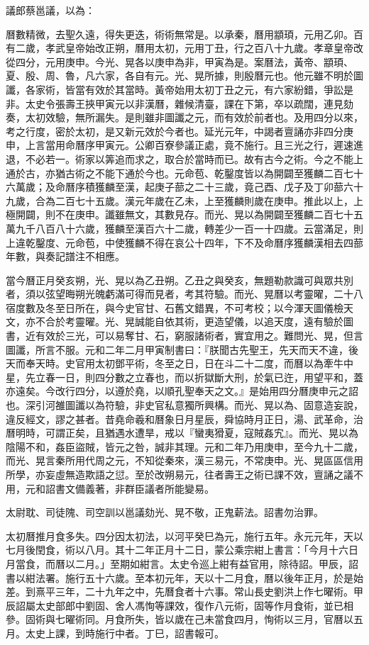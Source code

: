 \begin{pinyinscope}
議郎蔡邕議，以為：

曆數精微，去聖久遠，得失更迭，術術無常是。以承秦，曆用顓頊，元用乙卯。百有二歲，孝武皇帝始改正朔，曆用太初，元用丁丑，行之百八十九歲。孝章皇帝改從四分，元用庚申。今光、晃各以庚申為非，甲寅為是。案曆法，黃帝、顓頊、夏、殷、周、魯，凡六家，各自有元。光、晃所據，則殷曆元也。他元雖不明於圖讖，各家術，皆當有效於其當時。黃帝始用太初丁丑之元，有六家紛錯，爭訟是非。太史令張壽王挾甲寅元以非漢曆，雜候清臺，課在下第，卒以疏闊，連見劾奏，太初效驗，無所漏失。是則雖非圖讖之元，而有效於前者也。及用四分以來，考之行度，密於太初，是又新元效於今者也。延光元年，中謁者亶誦亦非四分庚申，上言當用命曆序甲寅元。公卿百寮參議正處，竟不施行。且三光之行，遲速進退，不必若一。術家以筭追而求之，取合於當時而已。故有古今之術。今之不能上通於古，亦猶古術之不能下通於今也。元命苞、乾鑿度皆以為開闢至獲麟二百七十六萬歲；及命曆序積獲麟至漢，起庚子蔀之二十三歲，竟己酉、戊子及丁卯蔀六十九歲，合為二百七十五歲。漢元年歲在乙未，上至獲麟則歲在庚申。推此以上，上極開闢，則不在庚申。讖雖無文，其數見存。而光、晃以為開闢至獲麟二百七十五萬九千八百八十六歲，獲麟至漢百六十二歲，轉差少一百一十四歲。云當滿足，則上違乾鑿度、元命苞，中使獲麟不得在哀公十四年，下不及命曆序獲麟漢相去四蔀年數，與奏記譜注不相應。

當今曆正月癸亥朔，光、晃以為乙丑朔。乙丑之與癸亥，無題勒款識可與眾共別者，須以弦望晦朔光魄虧滿可得而見者，考其符驗。而光、晃曆以考靈曜，二十八宿度數及冬至日所在，與今史官甘、石舊文錯異，不可考校；以今渾天圖儀檢天文，亦不合於考靈曜。光、晃誠能自依其術，更造望儀，以追天度，遠有驗於圖書，近有效於三光，可以易奪甘、石，窮服諸術者，實宜用之。難問光、晃，但言圖讖，所言不服。元和二年二月甲寅制書曰：『朕聞古先聖王，先天而天不違，後天而奉天時。史官用太初鄧平術，冬至之日，日在斗二十二度，而曆以為牽牛中星，先立春一日，則四分數之立春也，而以折獄斷大刑，於氣已迕，用望平和，蓋亦遠矣。今改行四分，以遵於堯，以順孔聖奉天之文。』是始用四分曆庚申元之詔也。深引河雒圖讖以為符驗，非史官私意獨所興構。而光、晃以為、固意造妄說，違反經文，謬之甚者。昔堯命羲和曆象日月星辰，舜協時月正日，湯、武革命，治曆明時，可謂正矣，且猶遇水遭旱，戒以『蠻夷猾夏，寇賊姦宄』。而光、晃以為陰陽不和，姦臣盜賊，皆元之咎，誠非其理。元和二年乃用庚申，至今九十二歲，而光、晃言秦所用代周之元，不知從秦來，漢三易元，不常庚申。光、晃區區信用所學，亦妄虛無造欺語之愆。至於改朔易元，往者壽王之術已課不效，亶誦之議不用，元和詔書文備義著，非群臣議者所能變易。

太尉耽、司徒隗、司空訓以邕議劾光、晃不敬，正鬼薪法。詔書勿治罪。

太初曆推月食多失。四分因太初法，以河平癸巳為元，施行五年。永元元年，天以七月後閏食，術以八月。其十二年正月十二日，蒙公乘宗紺上書言：「今月十六日月當食，而曆以二月。」至期如紺言。太史令巡上紺有益官用，除待詔。甲辰，詔書以紺法署。施行五十六歲。至本初元年，天以十二月食，曆以後年正月，於是始差。到熹平三年，二十九年之中，先曆食者十六事。常山長史劉洪上作七曜術。甲辰詔屬太史部郎中劉固、舍人馮恂等課效，復作八元術，固等作月食術，並已相參。固術與七曜術同。月食所失，皆以歲在己未當食四月，恂術以三月，官曆以五月。太史上課，到時施行中者。丁巳，詔書報可。


\end{pinyinscope}
